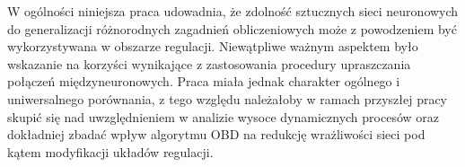 \par W ogólności niniejsza praca udowadnia, że zdolność sztucznych sieci neuronowych do generalizacji różnorodnych zagadnień obliczeniowych może z powodzeniem być wykorzystywana w obszarze regulacji. Niewątpliwe ważnym aspektem było wskazanie na korzyści wynikające z zastosowania procedury upraszczania połączeń międzyneuronowych. Praca miała jednak charakter ogólnego i uniwersalnego porównania, z tego względu należałoby w ramach przyszłej pracy skupić się nad uwzględnieniem w analizie wysoce dynamicznych procesów oraz dokładniej zbadać wpływ algorytmu OBD na redukcję wrażliwości sieci pod kątem modyfikacji układów regulacji. 